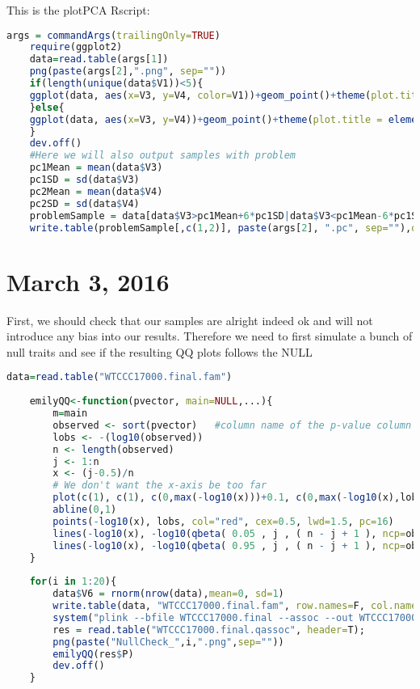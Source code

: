 \documentclass[12pt]{article}
\begin{document}
	This is the plotPCA Rscript:
	\begin{lstlisting}[language=R]
	args = commandArgs(trailingOnly=TRUE)
	require(ggplot2)
	data=read.table(args[1])
	png(paste(args[2],".png", sep=""))
	if(length(unique(data$V1))<5){
	ggplot(data, aes(x=V3, y=V4, color=V1))+geom_point()+theme(plot.title = element_text(lineheight=.8, face="bold",size=24),axis.text=element_text(size=16),axis.title=element_text(size=16,face="bold"))+labs(x="PC1",y="PC2")+ggtitle(args[2]);
	}else{
	ggplot(data, aes(x=V3, y=V4))+geom_point()+theme(plot.title = element_text(lineheight=.8, face="bold",size=24),axis.text=element_text(size=16),axis.title=element_text(size=16,face="bold"))+labs(x="PC1",y="PC2")+ggtitle(args[2]);
	}
	dev.off()
	#Here we will also output samples with problem
	pc1Mean = mean(data$V3)
	pc1SD = sd(data$V3)
	pc2Mean = mean(data$V4)
	pc2SD = sd(data$V4)
	problemSample = data[data$V3>pc1Mean+6*pc1SD|data$V3<pc1Mean-6*pc1SD |data$V4>pc2Mean+6*pc2SD|data$V4<pc2Mean-6*pc2SD,]
	write.table(problemSample[,c(1,2)], paste(args[2], ".pc", sep=""),quote=F, col.names=F, row.names=F)
	\end{lstlisting}

	\section{March 3, 2016}
	First, we should check that our samples are alright indeed ok and will not introduce any bias into our results.
	Therefore we need to first simulate a bunch of null traits and see if the resulting QQ plots follows the NULL
	\begin{lstlisting}[language=R]
	data=read.table("WTCCC17000.final.fam")
	
	emilyQQ<-function(pvector, main=NULL,...){
		m=main
		observed <- sort(pvector)   #column name of the p-value column is "p"
		lobs <- -(log10(observed))
		n <- length(observed)
		j <- 1:n
		x <- (j-0.5)/n
		# We don't want the x-axis be too far
		plot(c(1), c(1), c(0,max(-log10(x)))+0.1, c(0,max(-log10(x),lobs))+0.1, col="white", lwd=1, type="p", xlab=expression(Expected~~ -log[10](italic(p))), ylab=expression(Observed~~-log[10](italic(p))),xaxs="i", yaxs="i", bty="l",cex.lab=1.2, cex.axis=1.2, font.lab=2,las=1,main=m)
		abline(0,1)
		points(-log10(x), lobs, col="red", cex=0.5, lwd=1.5, pc=16)
		lines(-log10(x), -log10(qbeta( 0.05 , j , ( n - j + 1 ), ncp=observed) ),col="black",lty=2)
		lines(-log10(x), -log10(qbeta( 0.95 , j , ( n - j + 1 ), ncp=observed) ),col="black",lty=2)
	}
		
	for(i in 1:20){
		data$V6 = rnorm(nrow(data),mean=0, sd=1)
		write.table(data, "WTCCC17000.final.fam", row.names=F, col.names=F, quote=F)
		system("plink --bfile WTCCC17000.final --assoc --out WTCCC17000.final")
		res = read.table("WTCCC17000.final.qassoc", header=T);
		png(paste("NullCheck_",i,".png",sep=""))
		emilyQQ(res$P)
		dev.off()
	}
	\end{lstlisting}
	
\end{document}
